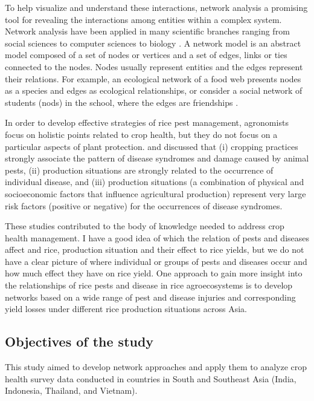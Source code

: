 To help visualize and understand these interactions, network analysis a promising tool for revealing the interactions among entities within a complex system. Network analysis have been applied in many scientific branches ranging from social sciences to computer sciences to biology \citep{Newman_2003_Structure}. A network model is an abstract model composed of a set of nodes or vertices and a set of edges, links or ties connected to the nodes. Nodes usually represent entities and the edges represent their relations. For example, an ecological network of a food web presents nodes as a species \citep{Krause_2003_Compartments} and edges as ecological relationships, or consider a social network of students (nods) in the school, where the edges are friendships \citep{Moody_2001_Race}.

In order to develop effective strategies of rice pest management, agronomists focus on holistic points related to crop health, but they do not focus on a particular aspects of plant protection. \citet{Savary_1995_Use,Savary_2000_Quantification} and \citet{Savary_2005_Multiple} discussed that (i) cropping practices strongly associate the pattern of disease syndromes and damage caused by animal pests, (ii) production situations are strongly related to the occurrence of individual disease, and (iii) production situations (a combination of physical and socioeconomic factors that influence agricultural production) represent very large risk factors (positive or negative) for the occurrences of disease syndromes.

These studies contributed to the body of knowledge needed to address crop health management. I have a good idea of which the relation of pests and diseases  affect and rice, production situation and their effect to rice yields, but we do not have a clear picture of where individual or groups of pests and diseases occur and how much effect they have on rice yield. One approach to gain more insight into the relationships of rice pests and disease in rice agroecosystems is to develop networks based on a wide range of pest and disease injuries and corresponding yield losses under different rice production situations across Asia. 


\subsection{Objectives of the study}

This study aimed to develop network approaches and apply them to analyze crop health survey data conducted in countries in South and Southeast Asia (India, Indonesia, Thailand, and Vietnam). 

